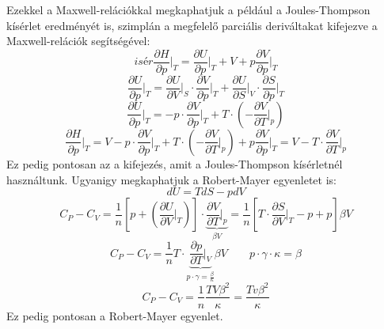\documentclass[../main.tex]{subfiles}
\begin{document}
Ezekkel a Maxwell-relációkkal megkaphatjuk a például a Joules-Thompson kísérlet eredményét is, szimplán a megfelelő parciális deriváltakat kifejezve a Maxwell-relációk segítségével:
\begin{equation}isér
    \frac{\partial H}{\partial p}\bigg|_{T} = \frac{\partial U}{\partial p}\bigg|_{T} + V + p \frac{\partial V}{\partial p}\bigg|_{T} 
\end{equation}
\begin{equation}
    \frac{\partial U}{\partial p}\bigg|_{T} = \frac{\partial U}{\partial V}\bigg|_{S} \cdot \frac{\partial V}{\partial p}\bigg|_{T} + \frac{\partial U}{\partial S}\bigg|_{V} \cdot \frac{\partial S}{\partial p}\bigg|_{T}
\end{equation}
\begin{equation}
    \frac{\partial U}{\partial p}\bigg|_{T} = -p \cdot \frac{\partial V}{\partial p}\bigg|_{T} + T \cdot \left(- \frac{\partial V}{\partial T}\bigg|_{p}\right)
\end{equation}
\begin{equation}
    \frac{\partial H}{\partial p}\bigg|_{T} = V - p \cdot \frac{\partial V}{\partial p}\bigg|_{T} + T \cdot \left(- \frac{\partial V}{\partial T}\big|_{p}\right) + p \frac{\partial V}{\partial p}\bigg|_{T} = V - T \cdot \frac{\partial V}{\partial T}\bigg|_{p}
\end{equation}
Ez pedig pontosan az a kifejezés, amit a Joules-Thompson kísérletnél használtunk.
\newline
\newline
Ugyanigy megkaphatjuk a Robert-Mayer egyenletet is:
\begin{equation}
    dU = TdS -pdV
\end{equation}
\begin{equation}
    C_P - C_V = \frac{1}{n} \left[p + \left(\frac{\partial U}{\partial V}\bigg|_{T}\right)\right] \cdot \underbrace{\frac{\partial V}{\partial T}\bigg|_{p}}_{\beta V} = \frac{1}{n} \left[T \cdot \frac{\partial S}{\partial V}\bigg|_{T}-p+p \right] \beta V
\end{equation}
\begin{equation}
    C_P - C_V = \frac{1}{n} T \cdot \underbrace{\frac{\partial p}{\partial T}\bigg|_{V}}_{p \cdot \gamma = \frac{\beta}{\kappa}} \beta V \qquad p \cdot \gamma \cdot \kappa = \beta
\end{equation}
\begin{equation}
    C_P - C_V = \frac{1}{n} \frac{TV\beta^2}{\kappa} = \frac{Tv\beta^2}{\kappa}
\end{equation}
Ez pedig pontosan a Robert-Mayer egyenlet.
\end{document}

